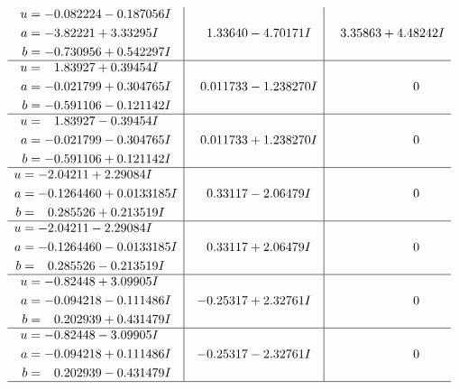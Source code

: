 \documentclass[1p]{elsarticle_modified}
\theoremstyle{definition}
\begin{document}
$$\begin{array}{c|c|c}
\begin{aligned}
u &= -0.082224 - 0.187056 I \\
a &= -3.82221 + 3.33295 I \\
b &= -0.730956 + 0.542297 I\end{aligned}
 & \phantom{-}1.33640 - 4.70171 I & \phantom{-}3.35863 + 4.48242 I \\ \hline\begin{aligned}
u &= \phantom{-}1.83927 + 0.39454 I \\
a &= -0.021799 + 0.304765 I \\
b &= -0.591106 - 0.121142 I\end{aligned}
 & \phantom{-}0.011733 - 1.238270 I & \phantom{-0.000000 } 0 \\ \hline\begin{aligned}
u &= \phantom{-}1.83927 - 0.39454 I \\
a &= -0.021799 - 0.304765 I \\
b &= -0.591106 + 0.121142 I\end{aligned}
 & \phantom{-}0.011733 + 1.238270 I & \phantom{-0.000000 } 0 \\ \hline\begin{aligned}
u &= -2.04211 + 2.29084 I \\
a &= -0.1264460 + 0.0133185 I \\
b &= \phantom{-}0.285526 + 0.213519 I\end{aligned}
 & \phantom{-}0.33117 - 2.06479 I & \phantom{-0.000000 } 0 \\ \hline\begin{aligned}
u &= -2.04211 - 2.29084 I \\
a &= -0.1264460 - 0.0133185 I \\
b &= \phantom{-}0.285526 - 0.213519 I\end{aligned}
 & \phantom{-}0.33117 + 2.06479 I & \phantom{-0.000000 } 0 \\ \hline\begin{aligned}
u &= -0.82448 + 3.09905 I \\
a &= -0.094218 - 0.111486 I \\
b &= \phantom{-}0.202939 + 0.431479 I\end{aligned}
 & -0.25317 + 2.32761 I & \phantom{-0.000000 } 0 \\ \hline\begin{aligned}
u &= -0.82448 - 3.09905 I \\
a &= -0.094218 + 0.111486 I \\
b &= \phantom{-}0.202939 - 0.431479 I\end{aligned}
 & -0.25317 - 2.32761 I & \phantom{-0.000000 } 0\\
 \hline 
 \end{array}$$\newpage\newpage\renewcommand{\arraystretch}{1}
\end{document}
